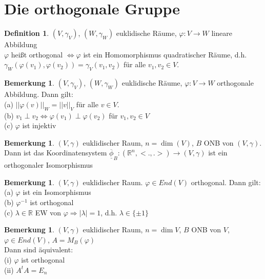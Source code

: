 \documentclass[10pt,a4paper,numbers=endperiod]{scrartcl}
\theoremstyle{definition}
\newtheorem{defi}[satz]{Definition}
\newtheorem{bem}[satz]{Bemerkung}
\def\RR{{\mathbb R}}
\begin{document}
\section{Die orthogonale Gruppe} 

\begin{defi}
	$(V, \gamma_V)$, $(W, \gamma_W)$ euklidische Räume, $\varphi: V \rightarrow W$ lineare Abbildung\\
	$\varphi$ heißt orthogonal $\Leftrightarrow \varphi$ ist ein Homomorphismus quadratischer Räume, d.h. $\gamma_W (\varphi(v_1), \varphi (v_2)) = \gamma_V (v_1, v_2)$ für alle $v_1, v_2 \in V$.
\end{defi}

\begin{bem}
	$(V, \gamma_V)$, $(W, \gamma_W)$ euklidische Räume, $\varphi: V \rightarrow W$ orthogonale Abbildung. Dann gilt:\\
	(a) $|| \varphi(v)||_W = ||v||_V$ für alle $v \in V$.\\
	(b) $v_1 \perp v_2 \Leftrightarrow \varphi(v_1) \perp \varphi(v_2)$ für $v_1, v_2 \in V$\\
	(c) $\varphi$ ist injektiv
\end{bem}

\begin{bem}
	$(V, \gamma)$ euklidischer Raum, $n = \dim (V)$, $B$ ONB von $(V, \gamma)$.\\
	Dann ist das Koordinatensystem $\overline{\underline{\phi}}_B: (\RR^n, <.,.>) \rightarrow (V, \gamma)$ ist ein orthogonaler Isomorphismus 
\end{bem}

\begin{bem}
	$(V, \gamma)$ euklidischer Raum. $\varphi \in End(V)$ orthogonal. Dann gilt:\\
	(a) $\varphi$ ist ein Isomorphismus\\
	(b) $\varphi^{-1}$ ist orthogonal\\
	(c) $\lambda \in \RR$ EW von $\varphi \Rightarrow |\lambda| = 1$, d.h. $\lambda \in \{\pm 1\}$  
\end{bem}

\begin{bem}
	$(V, \gamma)$ euklidischer Raum, $n = \dim V$, $B$ ONB von $V$, $\varphi \in End(V)$, $A = M_B(\varphi)$\\
	Dann sind äquivalent:\\
	(i) $\varphi$ ist orthogonal\\
	(ii) $A^t A = E_n$
\end{bem}
\end{document}
